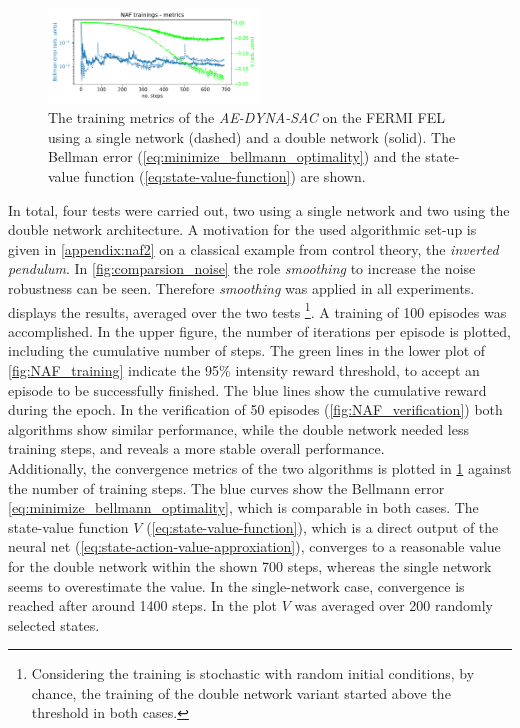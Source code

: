 \documentclass[
reprint,
amsmath,amssymb,amsfonts,clevref,
aps,
prstab,
]{revtex4-2}
\begin{document}
	\begin{figure}
		\centering
		\includegraphics*[width=0.5\textwidth]{Figures/FERMI_all_experiments_NAF_convergence.pdf}
		\caption{The training metrics of the \emph{AE-DYNA-SAC} on the FERMI FEL using a single network (dashed) and a double network (solid). The Bellman error (\cref{eq:minimize_bellmann_optimality}) and the state-value function (\cref{eq:state-value-function}) are shown. }
		\label{fig:NAF_convergence}
	\end{figure}
	In total, four tests were carried out, two using a single network and two using the double network architecture. A motivation for the used algorithmic set-up is given in \cref{appendix:naf2} on a classical example from control theory, the \emph{inverted pendulum}. In \cref{fig:comparsion_noise} the role \emph{smoothing} to increase the noise robustness can be seen. Therefore \emph{smoothing} was applied in all experiments.\\
	 displays the results, averaged over the two tests \footnote{Considering the training is stochastic with random initial conditions, by chance, the training of the double network variant started above the threshold in both cases.}. A training of 100 episodes was accomplished. In the upper figure, the number of iterations per episode is plotted, including the cumulative number of steps. The green lines in the lower plot of \cref{fig:NAF_training} indicate the 95\% intensity reward threshold, to accept an episode to be successfully finished. The blue lines show the cumulative reward during the epoch.
	In the verification of 50 episodes (\cref{fig:NAF_verification}) both algorithms show similar performance, while the double network needed less training steps, and reveals a more stable overall performance. \\
	Additionally, the convergence metrics of the two algorithms is plotted in \cref{fig:NAF_convergence} against the number of training steps. The blue curves show the Bellmann error \cref{eq:minimize_bellmann_optimality}, which is comparable in both cases. The state-value function $V$ (\cref{eq:state-value-function}), which is a direct output of the neural net (\cref{eq:state-action-value-approxiation}), converges to a reasonable value for the double network within the shown 700 steps, whereas the single network seems to overestimate the value. In the single-network case, convergence is reached after around 1400 steps. In the plot $V$ was averaged over 200 randomly selected states.
\end{document}
